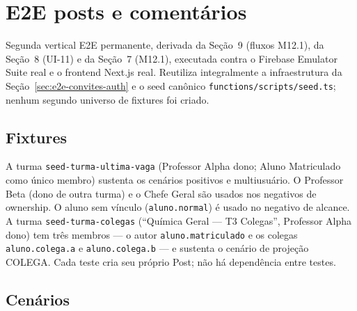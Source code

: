 \section{E2E posts e comentários}
\label{sec:e2e-posts-comentarios}

Segunda vertical E2E permanente, derivada da Seção~9 (fluxos M12.1), da
Seção~8 (UI-11) e da Seção~7 (M12.1), executada contra o Firebase Emulator
Suite real e o frontend Next.js real. Reutiliza integralmente a infraestrutura
da Seção~\ref{sec:e2e-convites-auth} e o seed canônico
\texttt{functions/scripts/seed.ts}; nenhum segundo universo de fixtures foi
criado.

\subsection{Fixtures}

A turma \texttt{seed-turma-ultima-vaga} (Professor Alpha dono; Aluno
Matriculado como único membro) sustenta os cenários positivos e multiusuário. O
Professor Beta (dono de outra turma) e o Chefe Geral são usados nos negativos
de ownership. O aluno sem vínculo (\texttt{aluno.normal}) é usado no negativo
de alcance. A turma \texttt{seed-turma-colegas} (``Química Geral — T3
Colegas'', Professor Alpha dono) tem três membros --- o autor
\texttt{aluno.matriculado} e os colegas \texttt{aluno.colega.a} e
\texttt{aluno.colega.b} --- e sustenta o cenário de projeção COLEGA. Cada teste
cria seu próprio Post; não há dependência entre testes.

\subsection{Cenários}

